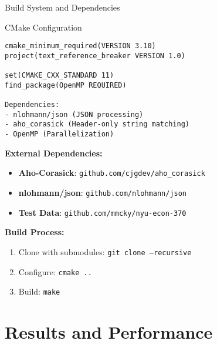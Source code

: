 \documentclass[aspectratio=169]{beamer}
\begin{document}
\begin{frame}[fragile]{Build System and Dependencies}
\begin{block}{CMake Configuration}
\begin{verbatim}
cmake_minimum_required(VERSION 3.10)
project(text_reference_breaker VERSION 1.0)

set(CMAKE_CXX_STANDARD 11)
find_package(OpenMP REQUIRED)

Dependencies:
- nlohmann/json (JSON processing)
- aho_corasick (Header-only string matching)
- OpenMP (Parallelization)
\end{verbatim}
\end{block}

\textbf{External Dependencies:}
\begin{itemize}
    \item \textbf{Aho-Corasick}: \small{\texttt{github.com/cjgdev/aho\_corasick}}
    \item \textbf{nlohmann/json}: \small{\texttt{github.com/nlohmann/json}}
    \item \textbf{Test Data}: \small{\texttt{github.com/mmcky/nyu-econ-370}}
\end{itemize}

\textbf{Build Process:}
\begin{enumerate}
    \item Clone with submodules: \texttt{git clone --recursive}
    \item Configure: \texttt{cmake ..}
    \item Build: \texttt{make}
\end{enumerate}
\end{frame}

\section{Results and Performance}
\end{document}
